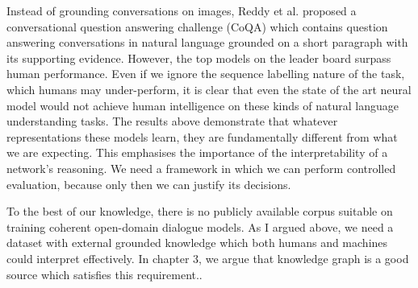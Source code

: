\documentclass[bsc,frontabs,twoside,singlespacing,parskip,deptreport]{infthesis}     %
\begin{document}
Instead of grounding conversations on images, Reddy et al.\cite{reddy2019coqa} proposed a conversational question answering challenge (CoQA) which contains question answering conversations in natural language grounded on a short paragraph with its supporting evidence. However, the top models on the leader board surpass human performance. Even if we ignore the sequence labelling nature of the task, which humans may under-perform, it is clear that even the state of the art neural model would not achieve human intelligence on these kinds of natural language understanding tasks. The results above demonstrate that whatever representations these models learn, they are fundamentally different from what we are expecting. This emphasises the importance of the interpretability of a network's reasoning. We need a framework in which we can perform controlled evaluation, because only then we can justify its decisions.

To the best of our knowledge, there is no publicly available corpus suitable on training coherent open-domain dialogue models. As I argued above, we need a dataset with external grounded knowledge which both humans and machines could interpret effectively. In chapter 3, we argue that knowledge graph is a good source which satisfies this requirement..
\end{document}
